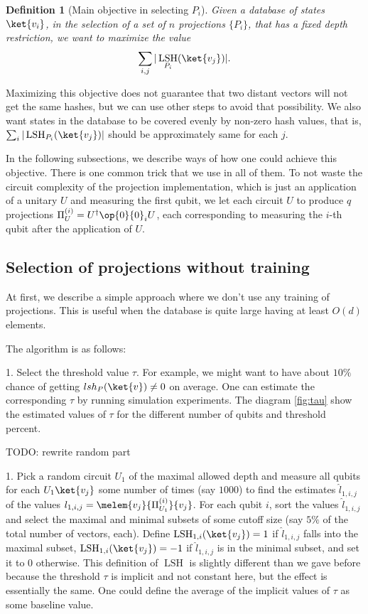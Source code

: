 \documentclass[pra,twocolumn,superscriptaddress,longbibliography]{revtex4-2}
\newtheorem{definition}{Definition}
\theoremstyle{remark}
\DeclareMathOperator{\lsh}{LSH}
\numberwithin{equation}{section}
\begin{document}
\begin{definition}[Main objective in selecting $P_i$] \label{def:obj}
Given a database of states $\ket{v_i}$, in the selection of a set of $n$ projections $\{P_i\}$, that has a fixed depth restriction, 
we want to maximize the value 
\begin{align}
\sum_{i,j} |\lsh_{P_i}(\ket{v_j})|.
\end{align}
\end{definition}

Maximizing this objective does not guarantee that two distant vectors will not get the same hashes, but we can use other steps to avoid that possibility. 
We also want states in the database to be covered evenly by non-zero hash values, 
that is, $\sum_{i} |\lsh_{P_i}(\ket{v_j})|$ should be approximately same for each $j$.

In the following subsections, we describe ways of how one could achieve this objective. 
There is one common trick that we use in all of them. 
To not waste the circuit complexity of the projection implementation, 
which is just an application of a unitary $U$ and measuring the first qubit, 
we let each circuit $U$ to produce $q$ projections $\Pi^{(i)}_{U} = U^\dagger \op{0}{0}_i U$, 
each corresponding to measuring the $i$-th qubit after the application of $U$. 

\subsection{Selection of projections without training}

At first, we describe a simple approach where we don't use any training of projections. 
This is useful when the database is quite large having at least $O(d)$ elements. 

The algorithm is as follows:

1. Select the threshold value $\tau$. For example, we might want to have about $10\%$ chance of getting 
$lsh_{P}(\ket{v}) \neq 0$ on average. One can estimate the corresponding $\tau$ by running simulation experiments. 
The diagram \ref{fig:tau} show the estimated values of $\tau$ for the different number of qubits and threshold percent. 


TODO: rewrite random part

1. Pick a random circuit $U_1$ of the maximal allowed depth and measure all qubits for each $U_1\ket{v_j}$ some number of times (say $1000$) 
to find the estimates $\hat{l}_{1,i,j}$ of the values $l_{1,i,j} = \melem{v_j}{\Pi^{(i)}_{U_1}}{v_j}$. For each qubit $i$, 
sort the values $\hat{l}_{1,i,j}$ and select the maximal and minimal subsets of some cutoff size 
(say $5\%$ of the total number of vectors, each). 
Define $\lsh_{1,i}(\ket{v_j}) = 1$ if $\hat{l}_{1,i,j}$ falls into the maximal subset, 
$\lsh_{1,i}(\ket{v_j}) = -1$ if $\hat{l}_{1,i,j}$ is in the minimal subset, and set it to $0$ otherwise. 
This definition of $\lsh$ is slightly different than we gave before because the threshold $\tau$ is implicit and not constant here, 
but the effect is essentially the same. One could define the average of the implicit values of $\tau$ as some baseline value. 
\end{document}
